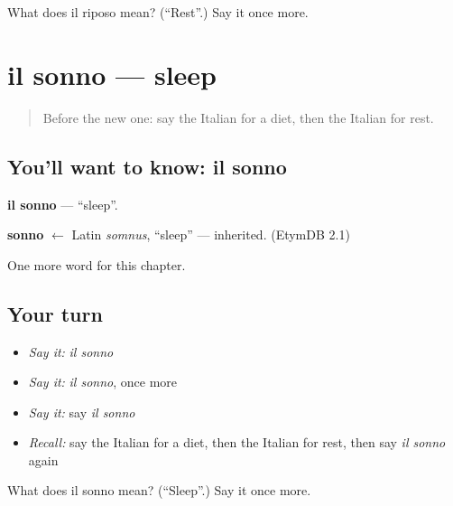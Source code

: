 \begin{tcolorbox}[breakable,colback=teal!4,colframe=teal!35!black,title={Before you move on}]
What does il riposo mean? (\textquotedblleft{}Rest\textquotedblright{}.) Say it once more.
\end{tcolorbox}
\section[il sonno]{il sonno — sleep}

\label{lesson:IT-C152-sonno}



\begin{quote}
Before the new one: say the Italian for a diet, then the Italian for rest.
\end{quote}

\subsection*{You'll want to know: il sonno}
\textbf{il sonno} — \textquotedblleft{}sleep\textquotedblright{}.

\begin{cousinweb}
\textbf{sonno} $\leftarrow$ Latin \emph{somnus}, \textquotedblleft{}sleep\textquotedblright{} — inherited. (EtymDB 2.1)
\end{cousinweb}

\begin{grammarlens}[title={What you've built}]
One more word for this chapter.
\end{grammarlens}

\subsection*{Your turn}
\begin{itemize}
\raggedright
  \item \emph{Say it:} \emph{il sonno}
  \item \emph{Say it:} \emph{il sonno}, once more
  \item \emph{Say it:} say \emph{il sonno}
  \item \emph{Recall:} say the Italian for a diet, then the Italian for rest, then say \emph{il sonno} again
\end{itemize}

\begin{tcolorbox}[breakable,colback=teal!4,colframe=teal!35!black,title={Before you move on}]
What does il sonno mean? (\textquotedblleft{}Sleep\textquotedblright{}.) Say it once more.
\end{tcolorbox}
